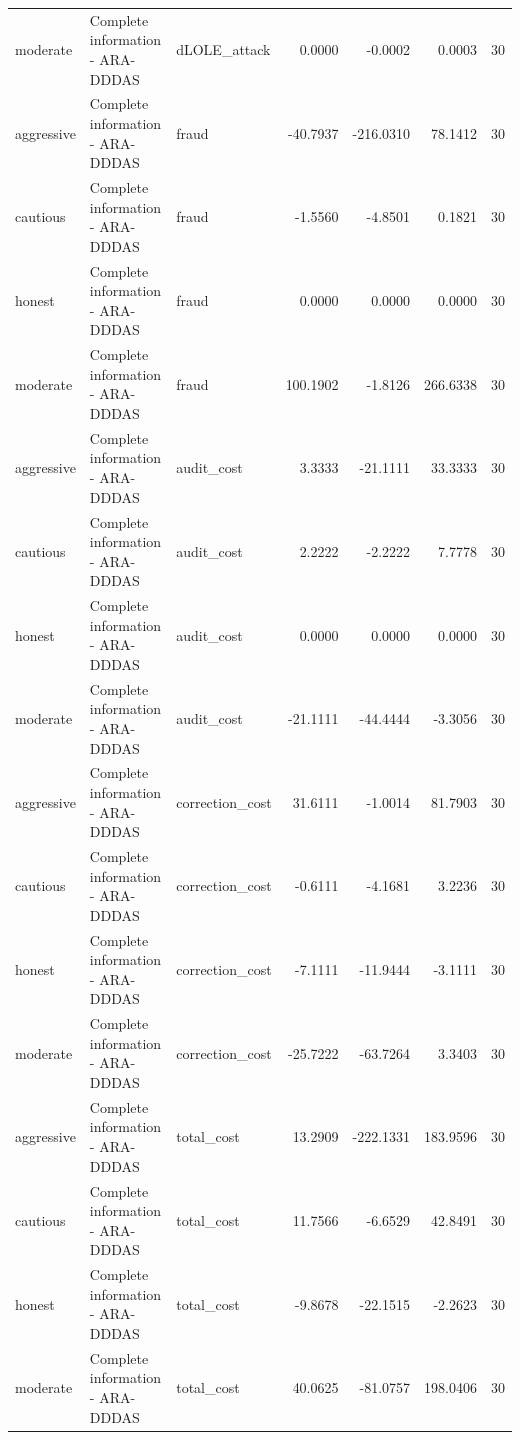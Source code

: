 \begin{tabular}{lllrrrr}
moderate & Complete information - ARA-DDDAS & dLOLE_attack & 0.0000 & -0.0002 & 0.0003 & 30 \\
aggressive & Complete information - ARA-DDDAS & fraud & -40.7937 & -216.0310 & 78.1412 & 30 \\
cautious & Complete information - ARA-DDDAS & fraud & -1.5560 & -4.8501 & 0.1821 & 30 \\
honest & Complete information - ARA-DDDAS & fraud & 0.0000 & 0.0000 & 0.0000 & 30 \\
moderate & Complete information - ARA-DDDAS & fraud & 100.1902 & -1.8126 & 266.6338 & 30 \\
aggressive & Complete information - ARA-DDDAS & audit_cost & 3.3333 & -21.1111 & 33.3333 & 30 \\
cautious & Complete information - ARA-DDDAS & audit_cost & 2.2222 & -2.2222 & 7.7778 & 30 \\
honest & Complete information - ARA-DDDAS & audit_cost & 0.0000 & 0.0000 & 0.0000 & 30 \\
moderate & Complete information - ARA-DDDAS & audit_cost & -21.1111 & -44.4444 & -3.3056 & 30 \\
aggressive & Complete information - ARA-DDDAS & correction_cost & 31.6111 & -1.0014 & 81.7903 & 30 \\
cautious & Complete information - ARA-DDDAS & correction_cost & -0.6111 & -4.1681 & 3.2236 & 30 \\
honest & Complete information - ARA-DDDAS & correction_cost & -7.1111 & -11.9444 & -3.1111 & 30 \\
moderate & Complete information - ARA-DDDAS & correction_cost & -25.7222 & -63.7264 & 3.3403 & 30 \\
aggressive & Complete information - ARA-DDDAS & total_cost & 13.2909 & -222.1331 & 183.9596 & 30 \\
cautious & Complete information - ARA-DDDAS & total_cost & 11.7566 & -6.6529 & 42.8491 & 30 \\
honest & Complete information - ARA-DDDAS & total_cost & -9.8678 & -22.1515 & -2.2623 & 30 \\
moderate & Complete information - ARA-DDDAS & total_cost & 40.0625 & -81.0757 & 198.0406 & 30 \\
\bottomrule
\end{tabular}
